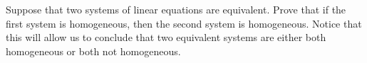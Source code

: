 Suppose that two systems of linear equations are equivalent.  Prove that if the first system is homogeneous, then the second system is homogeneous.  Notice that this will allow us to conclude that two equivalent systems are either both homogeneous or both not homogeneous.